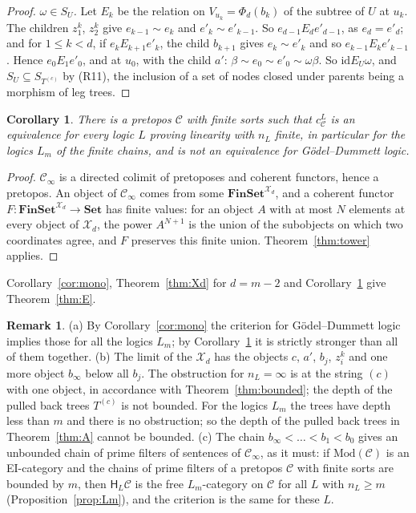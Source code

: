 \documentclass[11pt]{amsart}
\newtheorem{cor}[thm]{Corollary}
\theoremstyle{definition}
\newtheorem{rem}[thm]{Remark}
\newcommand{\Set}{\mathbf{Set}}
\newcommand{\Fin}{\mathbf{FinSet}}
\newcommand{\Mod}{\mathrm{Mod}}
\newcommand{\HH}{\mathsf H}
\newcommand{\cX}{\mathcal X}
\newcommand{\cC}{\mathcal C}
\newcommand{\id}{\mathrm{id}}
\begin{document}
\begin{proof}
\emph{$\omega\in S_U$.} Let $E_k$ be the relation on $V_{u_k}=
\Phi_d(b_k)$ of the subtree of $U$ at $u_k$. The children $z^k_1$,
$z^k_2$ give $e_{k-1}\sim e_k$ and $e'_k\sim e'_{k-1}$. So
$e_{d-1}\mathrel{E_d}e'_{d-1}$, as $e_d=e'_d$; and for $1\le k<d$, if
$e_k\mathrel{E_{k+1}}e'_k$, the child $b_{k+1}$ gives $e_k\sim e'_k$
and so $e_{k-1}\mathrel{E_k}e'_{k-1}$. Hence $e_0\mathrel{E_1}e'_0$,
and at $u_0$, with the child $a'$: $\beta\sim e_0\sim e'_0\sim
\omega\beta$. So $\id\mathrel{E_U}\omega$, and $S_U\subseteq
S_{T^{(c)}}$ by (R11), the inclusion of a set of nodes closed under
parents being a morphism of leg trees.
\end{proof}

\begin{cor}\label{cor:tower}
There is a pretopos $\cC$ with finite sorts such that $c^L_\cC$ is an
equivalence for every logic $L$ proving linearity with $n_L$ finite,
in particular for the logics $L_m$ of the finite chains, and is not an
equivalence for G\"odel--Dummett logic.
\end{cor}
\begin{proof}
$\cC_\infty$ is a directed colimit of pretoposes and coherent
functors, hence a pretopos. An object of $\cC_\infty$ comes from some
$\Fin^{\cX_d}$, and a coherent functor $F\colon\Fin^{\cX_d}\to\Set$
has finite values: for an object $A$ with at most $N$ elements at
every object of $\cX_d$, the power $A^{N+1}$ is the union of the
subobjects on which two coordinates agree, and $F$ preserves this
finite union. Theorem~\ref{thm:tower} applies.
\end{proof}

Corollary~\ref{cor:mono}, Theorem~\ref{thm:Xd} for $d=m-2$ and
Corollary~\ref{cor:tower} give Theorem~\ref{thm:E}.

\begin{rem}\label{rem:tower}
(a) By Corollary~\ref{cor:mono} the criterion for G\"odel--Dummett
logic implies those for all the logics $L_m$; by
Corollary~\ref{cor:tower} it is strictly stronger than all of them
together. (b) The limit of the $\cX_d$ has the objects $c$, $a'$,
$b_j$, $z^k_i$ and one more object $b_\infty$ below all $b_j$. The
obstruction for $n_L=\infty$ is at the string $(c)$ with one object,
in accordance with Theorem~\ref{thm:bounded}; the depth of the pulled
back trees $T^{(c)}$ is not bounded. For the logics $L_m$ the trees
have depth less than $m$ and there is no obstruction; so the depth of
the pulled back trees in Theorem~\ref{thm:A} cannot be bounded. (c) The chain $b_\infty<\dots<b_1<b_0$ gives an
unbounded chain of prime filters of sentences of $\cC_\infty$, as it
must: if $\Mod(\cC)$ is an EI-category and the chains of prime filters
of a pretopos $\cC$ with finite sorts are bounded by $m$, then $\HH_L\cC$ is the free $L_m$-category
on $\cC$ for all $L$ with $n_L\ge m$ (Proposition~\ref{prop:Lm}), and
the criterion is the same for these $L$.
\end{rem}
\end{document}
